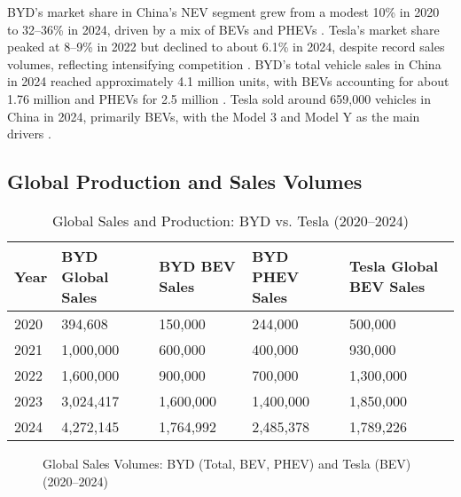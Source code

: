 \documentclass{article}
\begin{document}
BYD's market share in China's NEV segment grew from a modest 10\% in 2020 to 32--36\% in 2024, driven by a mix of BEVs and PHEVs \citep{cnn2025, autovista2025}. Tesla's market share peaked at 8--9\% in 2022 but declined to about 6.1\% in 2024, despite record sales volumes, reflecting intensifying competition \citep{cnevpost2025, cnn2025}. BYD's total vehicle sales in China in 2024 reached approximately 4.1 million units, with BEVs accounting for about 1.76 million and PHEVs for 2.5 million \citep{tridens2025}. Tesla sold around 659,000 vehicles in China in 2024, primarily BEVs, with the Model 3 and Model Y as the main drivers \citep{autovista2025}.

\subsection{Global Production and Sales Volumes}

\begin{table}[ht]
\centering
\caption{Global Sales and Production: BYD vs. Tesla (2020--2024)}
\label{tab:global_sales}
\begin{tabularx}{\textwidth}{l l l l l}
\toprule
Year & BYD Global Sales & BYD BEV Sales & BYD PHEV Sales & Tesla Global BEV Sales \\
\midrule
2020 & 394,608 & 150,000 & 244,000 & 500,000 \\
2021 & 1,000,000 & 600,000 & 400,000 & 930,000 \\
2022 & 1,600,000 & 900,000 & 700,000 & 1,300,000 \\
2023 & 3,024,417 & 1,600,000 & 1,400,000 & 1,850,000 \\
2024 & 4,272,145 & 1,764,992 & 2,485,378 & 1,789,226 \\
\bottomrule
\end{tabularx}
\end{table}

\begin{figure}[ht]
\centering
{}
\caption{Global Sales Volumes: BYD (Total, BEV, PHEV) and Tesla (BEV) (2020--2024)}
\label{fig:global_sales}
\end{figure}
\end{document}
